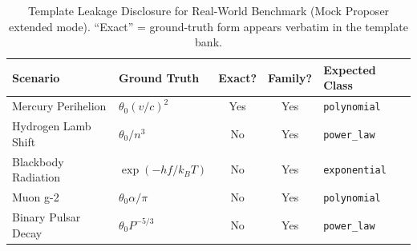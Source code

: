 \begin{table}[t]
\centering\footnotesize
\caption{Template Leakage Disclosure for Real-World Benchmark (Mock Proposer extended mode). ``Exact'' = ground-truth form appears verbatim in the template bank.}
\label{tab:template_leakage}
\begin{tabularx}{\textwidth}{l L c c l}
\toprule
\textbf{Scenario} & \textbf{Ground Truth} & \textbf{Exact?} & \textbf{Family?} & \textbf{Expected Class} \\
\midrule
Mercury Perihelion & $\theta_0 (v/c)^2$ & Yes & Yes & \texttt{polynomial} \\
Hydrogen Lamb Shift & $\theta_0 / n^3$ & No & Yes & \texttt{power\_law} \\
Blackbody Radiation & $\exp(-hf/k_BT)$ & No & Yes & \texttt{exponential} \\
Muon g-2 & $\theta_0 \alpha / \pi$ & No & Yes & \texttt{polynomial} \\
Binary Pulsar Decay & $\theta_0 P^{-5/3}$ & No & Yes & \texttt{power\_law} \\
\bottomrule
\end{tabularx}
\end{table}